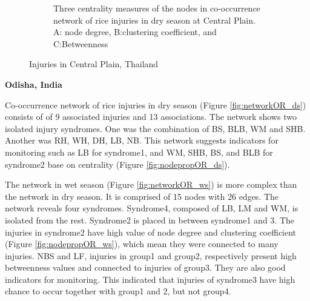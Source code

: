 \begin{figure}
\begin{subfigure}[b]{1\textwidth}
        \caption{Three centrality measures of the nodes in co-occurrence network of rice injuries in dry season at Central Plain. A: node degree, B:clustering coefficient, and C:Betweenness}
        \label{fig:nodepropCP_ws}
    \end{subfigure}
    \caption{Injuries in Central Plain, Thailand}
    \label{fig:CP_ws}
\end{figure}

\textbf{Odisha, India}

Co-occurrence network of rice injuries in dry season (Figure \ref{fig:networkOR_ds}) consists of of 9 associated injuries and 13 associations. The network shows two isolated injury syndromes. One was the combination of BS, BLB, WM and SHB. Another was RH, WH, DH, LB, NB. This network suggests indicators for monitoring such as LB for syndrome1, and WM, SHB, BS, and BLB for syndrome2 base on centrality (Figure \ref{fig:nodepropOR_ds}).  

The network in wet season (Figure \ref{fig:networkOR_ws}) is more complex than the network in dry season. It is comprised of 15 nodes with 26 edges. The network reveals four syndromes. Syndrome4, composed of LB, LM and WM, is isolated from the rest. Syndrome2 is placed in between syndrome1 and 3. The injuries in syndrome2 have high value of node degree and clustering coefficient (Figure \ref{fig:nodepropOR_ws}), which mean they were connected to many injuries. NBS and LF, injuries in group1 and group2, respectively present high betweenness values and connected to injuries of group3. They are also good indicators for monitoring. This indicated that injuries of syndrome3 have high chance to occur together with group1 and 2, but not group4. 

